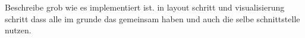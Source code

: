 Beschreibe grob wie es implementiert ist.
in layout schritt 
und visualisierung schritt
dass alle im grunde das gemeinsam haben und auch die selbe schnittstelle nutzen.
